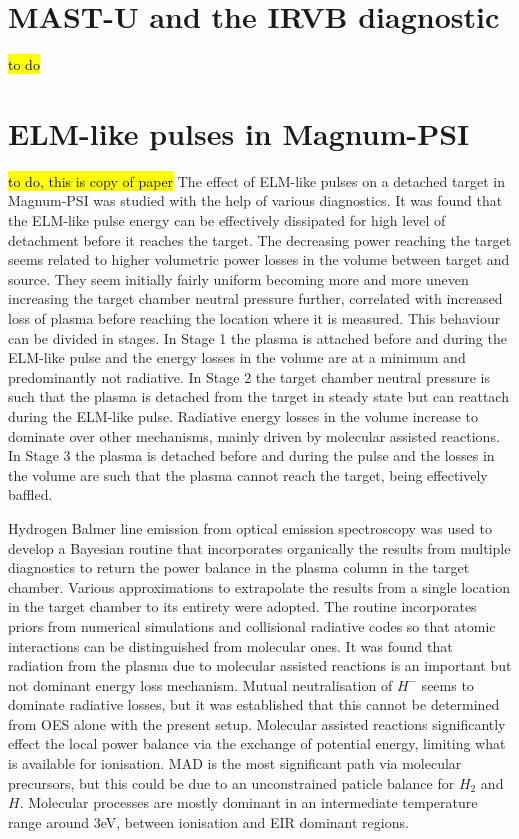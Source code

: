 

\section{MAST-U and the IRVB diagnostic}\label{MAST-U and the IRVB diagnostic}
\hl{to do}

\section{ELM-like pulses in Magnum-PSI}\label{ELM-like pulses in Magnum-PSI}
\hl{to do, this is copy of paper}
The effect of ELM-like pulses on a detached target in Magnum-PSI was studied with the help of various diagnostics. It was found that the ELM-like pulse energy can be effectively dissipated for high level of detachment before it reaches the target. The decreasing power reaching the target seems related to higher volumetric power losses in the volume between target and source. They seem initially fairly uniform becoming more and more uneven increasing the target chamber neutral pressure further, correlated with increased loss of plasma before reaching the location where it is measured. This behaviour can be divided in stages. In Stage 1 the plasma is attached before and during the ELM-like pulse and the energy losses in the volume are at a minimum and predominantly not radiative. In Stage 2 the target chamber neutral pressure is such that the plasma is detached from the target in steady state but can reattach during the ELM-like pulse. Radiative energy losses in the volume increase to dominate over other mechanisms, mainly driven by molecular assisted reactions. In Stage 3 the plasma is detached before and during the pulse and the losses in the volume are such that the plasma cannot reach the target, being effectively baffled.

Hydrogen Balmer line emission from optical emission spectroscopy was used to develop a Bayesian routine that incorporates organically the results from multiple diagnostics to return the power balance in the plasma column in the target chamber. Various approximations to extrapolate the results from a single location in the target chamber to its entirety were adopted. The routine incorporates priors from numerical simulations and collisional radiative codes so that atomic interactions can be distinguished from molecular ones. It was found that radiation from the plasma due to molecular assisted reactions is an important but not dominant energy loss mechanism. Mutual neutralisation of ${H}^-$ seems to dominate radiative losses, but it was established that this cannot be determined from OES alone with the present setup. Molecular assisted reactions significantly effect the local power balance via the exchange of potential energy, limiting what is available for ionisation. MAD is the most significant path via molecular precursors, but this could be due to an unconstrained paticle balance for $H_2$ and $H$. Molecular processes are mostly dominant in an intermediate temperature range around 3eV, between ionisation and EIR dominant regions.

